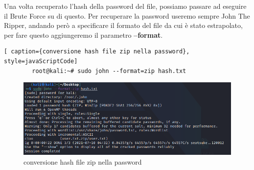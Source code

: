     Una volta recuperato l'hash della password del file, possiamo passare ad eseguire il Brute Force su di questo. Per recuperare la password useremo sempre John The Ripper, andando però a specificare il formato del file da cui è stato estrapolato, per fare questo aggiungeremo il parametro \textbf{--format}.  

    \begin{lstlisting}[ caption={conversione hash file zip nella password}, style=javaScriptCode]
        root@kali:~# sudo john --format=zip hash.txt
    \end{lstlisting}

    \begin{figure}[h!]
        \centering
        \includegraphics[width=\linewidth]{Immagini/3/hash_ex_2.png}
        \caption{conversione hash file zip nella password}
    \end{figure}